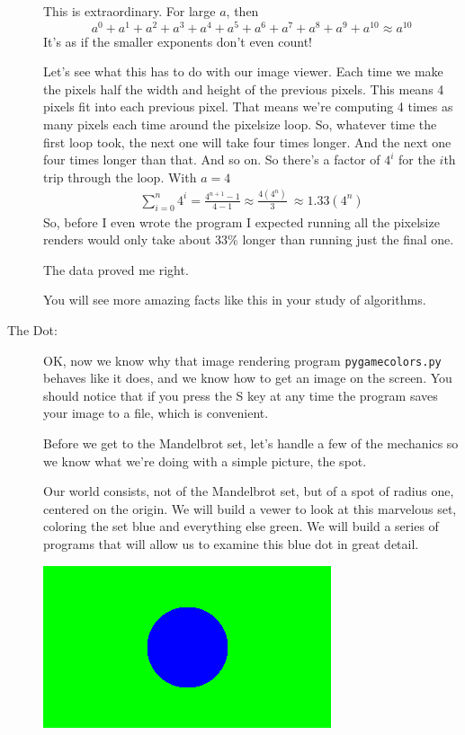 \documentclass[12pt]{article}
\begin{document}
\begin{description}
This is extraordinary.  For large $a$, then
\[
a^0 + a^1 + a^2 + a^3 + a^4 + a^5 + a^6 + a^7 + a^8 + a^9 + a^{10} \approx a^{10}
\]
It's as if the smaller exponents don't even count!

Let's see what this has to do with our image viewer.
Each time we make the pixels half the width
and height of the previous pixels.  This means 
4 pixels fit into each previous pixel.  That
means we're computing 4 times as many pixels
each time around the pixelsize loop.  So, whatever
time the first loop took, the next one will take
four times longer.  And the next one four times longer than
that.  And so on.  So there's a factor of $4^i$
for the $i$th trip through the loop.  With $a=4$
\begin{align*}
\sum_{i=0}^{n} 4^i = \frac{4^{n+1} - 1}{4-1} 
 \approx \frac{4(4^n)}{3}\
 \approx 1.33(4^n)
\end{align*}
So, before I even wrote the program I expected
running all the pixelsize renders would only take
about 33\% longer than running just the final one.

The data proved me right.

You will see more amazing facts like this in your
study of algorithms.

\item[The Dot:] OK, now we know why that image rendering
program \lstinline{pygamecolors.py}
behaves like it does, and we know how to
get an image on the screen.  You should notice that
if you press the S key at any time the program
saves your image to a file, which is convenient.

Before we get to the Mandelbrot
set, let's handle a few of the mechanics so we
know what we're doing with a simple picture,
the spot.  

Our world consists, not of the Mandelbrot set,
but of a
spot of radius one, centered on the origin.
We will build a vewer to look at this marvelous
set, coloring the set blue and everything else 
green.  We will build a series of programs
that will allow us to examine this blue dot
in great detail.  

\centerline{\includegraphics[scale=0.5]{spot}}


\end{description}
\end{document}

